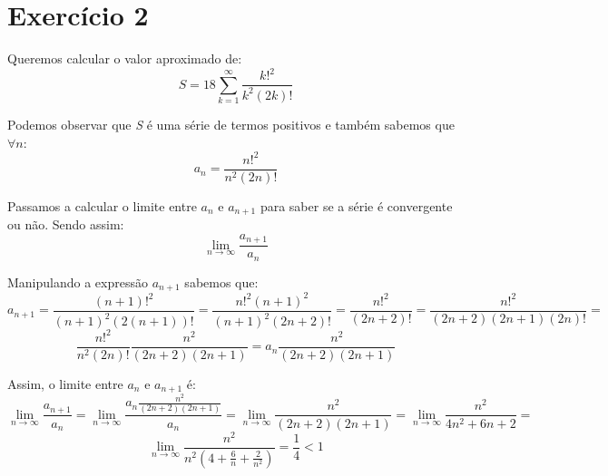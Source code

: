 \documentclass[12pt, letterpaper]{article}
\begin{document}
\section*{Exercício 2}
Queremos calcular o valor aproximado de:
\[S=18\sum_{k=1}^{\infty}\frac{k!^2}{k^2(2k)!}\]

Podemos observar que \textit{S} é uma série de termos positivos e também sabemos que $\forall n$:
$$a_n = \frac{n!^2}{n^2(2n)!}$$
\newline

Passamos a calcular o limite entre $a_n$ e $a_{n+1}$ para saber se a série é convergente ou não. Sendo assim: 
$$\lim_{n \to \infty} \frac{a_{n+1}}{a_n}$$
\newline

Manipulando a expressão $a_{n+1}$ sabemos que:
$$a_{n+1} = \frac{(n+1)!^2}{(n+1)^2(2(n+1))!} = \frac{n!^2(n+1)^2}{(n+1)^2(2n+2)!} = \frac{n!^2}{(2n+2)!} = \frac{n!^2}{(2n+2)(2n+1)(2n)!} =$$
$$\frac{n!^2}{n^2(2n)!} \frac{n^2}{(2n+2)(2n+1)} = a_n\frac{n^2}{(2n+2)(2n+1)}$$
\newline

Assim, o limite entre $a_n$ e $a_{n+1}$ é:
$$\lim_{n \to \infty} \frac{a_{n+1}}{a_n} = \lim_{n \to \infty} \frac{a_n \frac{n^2}{(2n+2)(2n+1)}}{a_n} = \lim_{n \to \infty} \frac{n^2}{(2n+2)(2n+1)} = \lim_{n \to \infty} \frac{n^2}{4n^2+6n+2} = $$
$$\lim_{n \to \infty} \frac{n^2}{n^2(4+ \frac{6}{n} + \frac{2}{n^2})} = \frac{1}{4} < 1$$
\newline
\end{document}
